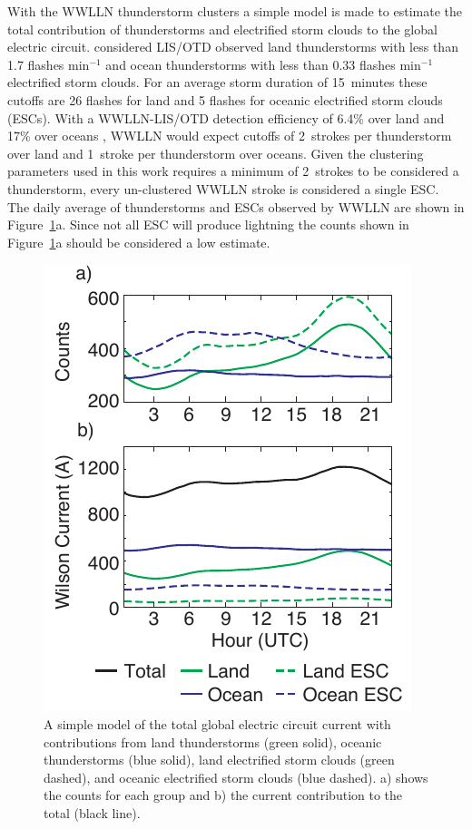 With the WWLLN thunderstorm clusters a simple model is made to estimate the total contribution of thunderstorms and electrified storm clouds to the global electric circuit.
\citet{Mach2011} considered LIS/OTD observed land thunderstorms with less than 1.7 flashes min$^{-1}$ and ocean thunderstorms with less than 0.33 flashes min$^{-1}$ electrified storm clouds.
For an average storm duration of 15~minutes these cutoffs are 26 flashes for land and 5 flashes for oceanic electrified storm clouds (ESCs).
With a WWLLN-LIS/OTD detection efficiency of 6.4\% over land and 17\% over oceans \citep{Rudlosky2013}, WWLLN would expect cutoffs of 2~strokes per thunderstorm over land and 1~stroke per thunderstorm over oceans.
Given the clustering parameters used in this work requires a minimum of 2~strokes to be considered a thunderstorm, every un-clustered WWLLN stroke is considered a single ESC.
The daily average of thunderstorms and ESCs observed by WWLLN are shown in Figure~\ref{gec:fig:wilson}a.
Since not all ESC will produce lightning the counts shown in Figure~\ref{gec:fig:wilson}a should be considered a low estimate.

  \begin{figure}[ht!]
    \centering
    \includegraphics[scale=1]{GEC/Figures/wilson.pdf} 
    \caption{A simple model of the total global electric circuit current with contributions from land thunderstorms (green solid), oceanic thunderstorms (blue solid), land electrified storm clouds (green dashed), and oceanic electrified storm clouds (blue dashed).
    		a) shows the counts for each group and b) the current contribution to the total (black line).
		}
    \label{gec:fig:wilson}
 \end{figure}

